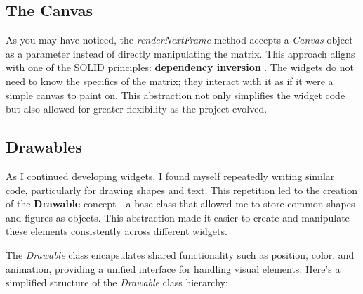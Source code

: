 \subsection{The Canvas} As you may have noticed, the \textit{renderNextFrame} method accepts a \textit{Canvas} object as a parameter instead of directly manipulating the matrix. This approach aligns with one of the SOLID principles: \textbf{dependency inversion} \cite{dep_inv_principle}. The widgets do not need to know the specifics of the matrix; they interact with it as if it were a simple canvas to paint on. This abstraction not only simplifies the widget code but also allowed for greater flexibility as the project evolved.

\subsection{Drawables}
\label{widget_canvas_abstraction}
As I continued developing widgets, I found myself repeatedly writing similar code, particularly for drawing shapes and text. This repetition led to the creation of the \textbf{Drawable} concept—a base class that allowed me to store common shapes and figures as objects. This abstraction made it easier to create and manipulate these elements consistently across different widgets.

The \textit{Drawable} class encapsulates shared functionality such as position, color, and animation, providing a unified interface for handling visual elements. Here's a simplified structure of the \textit{Drawable} class hierarchy:

\begin{center}
\end{center}

